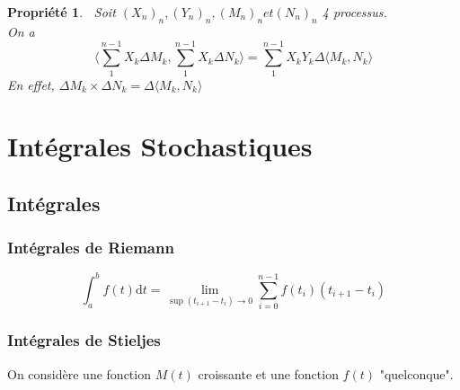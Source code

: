 \documentclass{report}
\newtheorem{prop}{Propri\'et\'e}
\newenvironment{encadre}{%
  \setlength{\theorempreskipamount}{0pt}%
  \setlength{\theorempostskipamount}{0pt}%
  \begin{framed}%
 }{%
  \vspace{-2pt}%
  \end{framed}%
 }
\begin{document}
\begin{encadre}
\begin{prop}$\ $
Soit $(X_n)_n, (Y_n)_n, (M_n)_n et (N_n)_n$ 4 processus.\\
On a \[\bigg\langle \displaystyle\sum_1^{n-1}X_k\Delta M_k, \displaystyle\sum_1^{n-1}X_k\Delta N_k\bigg\rangle = \displaystyle\sum_1^{n-1}X_kY_k \Delta \langle M_k, N_k\rangle \]
En effet, $\Delta M_k \times \Delta N_k = \Delta\langle M_k, N_k\rangle$

\centering
\vspace{0.3cm}
\end{prop}
\end{encadre}




\section{Intégrales Stochastiques}
\subsection{Intégrales}
\subsubsection{Intégrales de Riemann}

\[\displaystyle\int^b_af(t)\mathrm{d}t = \displaystyle\lim_{\sup(t_{i+1}-t_i)\to 0} \displaystyle\sum^{n-1}_{i=0}f(t_i)(t_{i+1}-t_i)\]


\vspace{0.4cm}

\subsubsection{Intégrales de Stieljes}
On considère une fonction $M(t)$ croissante et une fonction $f(t)$ "quelconque".
\end{document}
